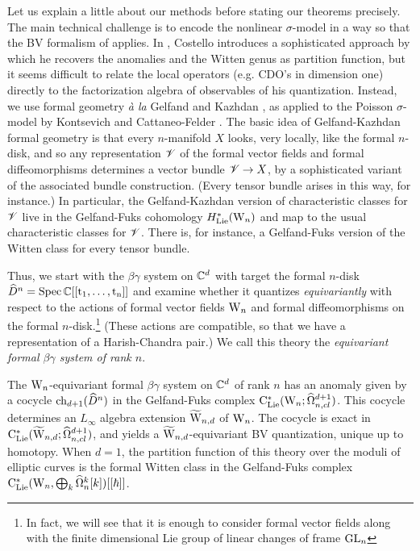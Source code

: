 Let us explain a little about our methods before stating our theorems precisely. 
The main technical challenge is to encode the nonlinear $\sigma$-model in a way so that the BV formalism of \cite{CostelloRenormalization} applies. 
In \cite{WG2}, Costello introduces a sophisticated approach by which he recovers the anomalies and the Witten genus as partition function, but it seems difficult to relate the local operators (e.g. CDO's in dimension one) directly to the factorization algebra of observables of his quantization. 
Instead, we use formal geometry {\it \`a la} Gelfand and Kazhdan \cite{GK}, as applied to the Poisson $\sigma$-model by Kontsevich \cite{KonDQ} and Cattaneo-Felder \cite{CF}.
The basic idea of Gelfand-Kazhdan formal geometry is that every $n$-manifold $X$ looks, very locally, like the formal $n$-disk, and so any representation $\mathscr V$ of the formal vector fields and formal diffeomorphisms determines a vector bundle $\mathscr V \to X$, by a sophisticated variant of the associated bundle construction. (Every tensor bundle arises in this way, for instance.) In particular, the Gelfand-Kazhdan version of characteristic classes for $\mathscr V$ live in the Gelfand-Fuks cohomology $H^*_{\rm Lie}({{\rm W}_n})$ and map to the usual characteristic classes for $\mathscr V$. There is, for instance, a Gelfand-Fuks version of the Witten class for every tensor bundle.

Thus, we start with the $\beta\gamma$ system on $\mathbb C^d$ with target the formal $n$-disk $\widehat{D}^n = \rm{Spec}\,\mathbb C[[t_1,\ldots,t_n]]$ and examine whether it quantizes \emph{equivariantly} with respect to the actions of formal vector fields ${{\rm W}_n}$ and formal diffeomorphisms on the formal $n$-disk.\footnote{In fact, we will see that it is enough to consider formal vector fields along with the finite dimensional Lie group of linear changes of frame ${\rm GL}_n$} (These actions are compatible, so that we have a representation of a Harish-Chandra pair.) We call this theory the \emph{equivariant formal $\beta\gamma$ system of rank $n$}.

\begin{thm}
The ${{\rm W}_n}$-equivariant formal $\beta\gamma$ system on $\mathbb C^d$ of rank $n$ has an anomaly given by a cocycle ${\rm ch}_{d+1} (\widehat{D}^n)$ in the Gelfand-Fuks  complex ${\rm C}_{{\rm Lie}}^*({{\rm W}_n} ; \widehat{\Omega}^{d+1}_{n,cl})$. 
This cocycle determines an $L_\infty$ algebra extension $\widetilde{\rm W}_{n,d}$ of ${{\rm W}_n}$. 
The cocycle is exact in ${\rm C}_{{\rm Lie}}^*(\widetilde{\rm W}_{n,d} ; \widehat{\Omega}^{d+1}_{n,cl})$, and yields a $\widetilde{\rm W}_{n,d}$-equivariant BV quantization, unique up to homotopy. 
When $d=1$, the partition function of this theory over the moduli of elliptic curves is the formal Witten class in the Gelfand-Fuks  complex ${\rm C}_{{\rm Lie}}^*({{\rm W}_n}, \bigoplus_k \widehat{\Omega}_n^k[k])[[\hbar]]$.
\end{thm}

